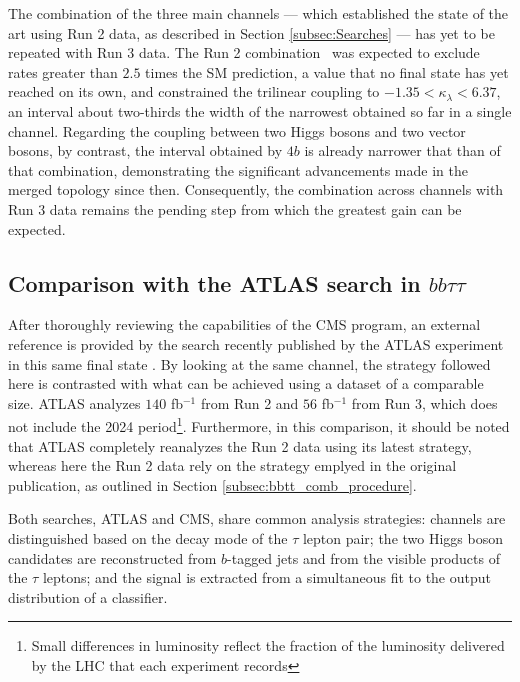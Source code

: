 
The combination of the three main channels — which established the state of the art using Run 2 data, as described in Section \ref{subsec:Searches} — has yet to be repeated with Run 3 data. The Run 2 combination~\cite{CMS_combination} was expected to exclude rates greater than $2.5$ times the SM prediction, a value that no final state has yet reached on its own, and constrained the trilinear coupling to $-1.35 < \kappa_\lambda < 6.37$, an interval about two-thirds the width of the narrowest obtained so far in a single channel. Regarding the coupling between two Higgs bosons and two vector bosons, by contrast, the interval obtained by $4b$ is already narrower that than of that combination, demonstrating the significant advancements made in the merged topology since then. Consequently, the combination across channels with Run 3 data remains the pending step from which the greatest gain can be expected.


\subsection{Comparison with the ATLAS search in \texorpdfstring{$bb\tau\tau$}{bbtautau}}
\label{subsec:bbtt_comp_atlas}
%
After thoroughly reviewing the capabilities of the CMS program, an external reference is provided by the search recently published by the ATLAS experiment in this same final state \cite{ATLAS-HH-bbtautau-Run3}. By looking at the same channel, the strategy followed here is contrasted with what can be achieved using a dataset of a comparable size. ATLAS analyzes $140$ fb$^{-1}$ from Run 2 and $56$ fb$^{-1}$ from Run 3, which does not include the 2024 period\footnote{Small differences in luminosity reflect the fraction of the luminosity delivered by the LHC that each experiment records}. Furthermore, in this comparison, it should be noted that ATLAS completely reanalyzes the Run 2 data using its latest strategy, whereas here the Run 2 data rely on the strategy emplyed in the original publication, as outlined in Section \ref{subsec:bbtt_comb_procedure}.\medskip

Both searches, ATLAS and CMS, share common analysis strategies: channels are distinguished based on the decay mode of the $\tau$ lepton pair; the two Higgs boson candidates are reconstructed from $b$-tagged jets and from the visible products of the $\tau$ leptons; and the signal is extracted from a simultaneous fit to the output distribution of a classifier.

